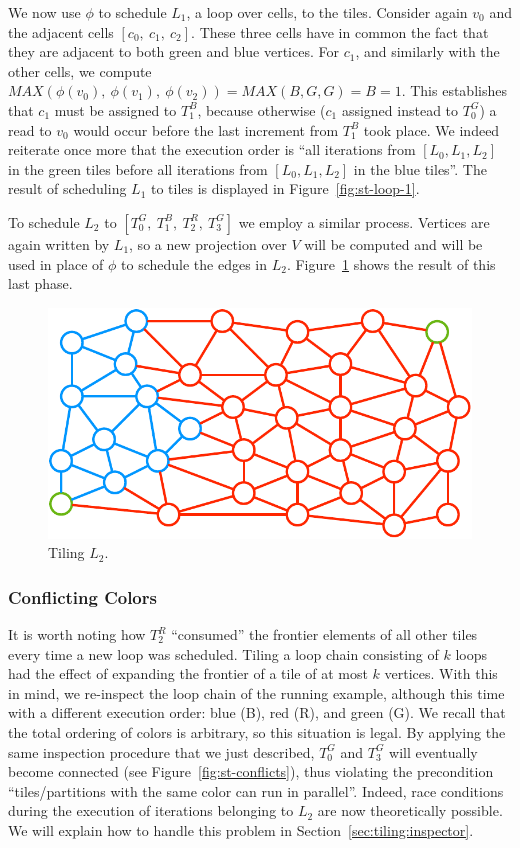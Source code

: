 We now use $\phi$ to schedule $L_1$, a loop over cells, to the tiles. Consider again $v_0$ and the adjacent cells $[c_0,\ c_1,\ c_2]$. These three cells have in common the fact that they are adjacent to both green and blue vertices. For $c_1$, and similarly with the other cells, we compute $MAX(\phi(v_0),\ \phi(v_1),\ \phi(v_2)) = MAX(B, G, G) = B = 1$. This establishes that $c_1$ must be assigned to $T_1^B$, because otherwise ($c_1$ assigned instead to $T_0^G$) a read to $v_0$ would occur before the last increment from $T_1^B$ took place. We indeed reiterate once more that the execution order is ``all iterations from $[L_0, L_1, L_2]$ in the green tiles before all iterations from $[L_0, L_1, L_2]$ in the blue tiles''. The result of scheduling $L_1$ to tiles is displayed in Figure~\ref{fig:st-loop-1}.

To schedule $L_2$ to $[T_0^G,\ T_1^B,\ T_2^R,\ T_3^G]$ we employ a similar process. Vertices are again written by $L_1$, so a new projection over $V$ will be computed and will be used in place of $\phi$ to schedule the edges in $L_2$. Figure~\ref{fig:st-loop-2} shows the result of this last phase. 

\begin{figure}[h]
\centering
\includegraphics[scale=0.7]{sparsetiling/figures/loop_2.pdf}
\caption{Tiling $L_2$.}
\label{fig:st-loop-2}
\end{figure}


\subsubsection*{Conflicting Colors}
It is worth noting how $T_2^R$ ``consumed'' the frontier elements of all other tiles every time a new loop was scheduled. Tiling a loop chain consisting of $k$ loops had the effect of expanding the frontier of a tile of at most $k$ vertices. With this in mind, we re-inspect the loop chain of the running example, although this time with a different execution order: blue (B), red (R), and green (G). We recall that the total ordering of colors is arbitrary, so this situation is legal. By applying the same inspection procedure that we just described, $T_0^G$ and $T_3^G$ will eventually become connected (see Figure~\ref{fig:st-conflicts}), thus violating the precondition ``tiles/partitions with the same color can run in parallel''. Indeed, race conditions during the execution of iterations belonging to $L_2$ are now theoretically possible. We will explain how to handle this problem in Section~\ref{sec:tiling:inspector}.

